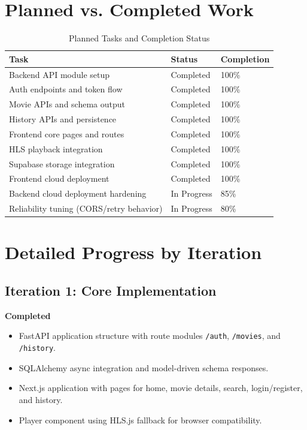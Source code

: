 \documentclass[conference]{IEEEtran}
\begin{document}
\section{Planned vs. Completed Work}
\begin{table}[h]
\caption{Planned Tasks and Completion Status}
\label{tab:planstatus}
\centering
\begin{tabular}{p{3.3cm} p{2.2cm} p{1.2cm}}
\toprule
\textbf{Task} & \textbf{Status} & \textbf{Completion} \\
\midrule
Backend API module setup & Completed & 100\% \\
Auth endpoints and token flow & Completed & 100\% \\
Movie APIs and schema output & Completed & 100\% \\
History APIs and persistence & Completed & 100\% \\
Frontend core pages and routes & Completed & 100\% \\
HLS playback integration & Completed & 100\% \\
Supabase storage integration & Completed & 100\% \\
Frontend cloud deployment & Completed & 100\% \\
Backend cloud deployment hardening & In Progress & 85\% \\
Reliability tuning (CORS/retry behavior) & In Progress & 80\% \\
\bottomrule
\end{tabular}
\end{table}

\section{Detailed Progress by Iteration}
\subsection{Iteration 1: Core Implementation}
\textbf{Completed}
\begin{itemize}
\item FastAPI application structure with route modules \texttt{/auth}, \texttt{/movies}, and \texttt{/history}.
\item SQLAlchemy async integration and model-driven schema responses.
\item Next.js application with pages for home, movie details, search, login/register, and history.
\item Player component using HLS.js fallback for browser compatibility.
\end{itemize}
\end{document}
